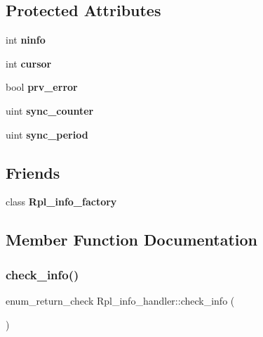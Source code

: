 \subsection*{Protected Attributes}
\begin{DoxyCompactItemize}
\item 
\mbox{\label{classRpl__info__handler_a8dc4370297208755daea7f8b8859ff5c}} 
int {\bfseries ninfo}
\item 
\mbox{\label{classRpl__info__handler_af15582cb62de38ca355b9c96be560506}} 
int {\bfseries cursor}
\item 
\mbox{\label{classRpl__info__handler_a57acd5b5edb82341b669a811d90662f0}} 
bool {\bfseries prv\+\_\+error}
\item 
\mbox{\label{classRpl__info__handler_a796d140a47f573cabd388b82598578a2}} 
uint {\bfseries sync\+\_\+counter}
\item 
\mbox{\label{classRpl__info__handler_ae99499ab0814c9f05a49437a3f8c0a27}} 
uint {\bfseries sync\+\_\+period}
\end{DoxyCompactItemize}
\subsection*{Friends}
\begin{DoxyCompactItemize}
\item 
\mbox{\label{classRpl__info__handler_a78a99f8bbca705e7958bb3ffaac85abd}} 
class {\bfseries Rpl\+\_\+info\+\_\+factory}
\end{DoxyCompactItemize}


\subsection{Member Function Documentation}
\mbox{\label{classRpl__info__handler_a0afe20cc43d797feca8e6bc107502b9b}} 
\subsubsection{\texorpdfstring{check\+\_\+info()}{check\_info()}}
{\footnotesize\ttfamily enum\+\_\+return\+\_\+check Rpl\+\_\+info\+\_\+handler\+::check\+\_\+info (\begin{DoxyParamCaption}{ }\end{DoxyParamCaption})\hspace{0.3cm}{\ttfamily [inline]}}

